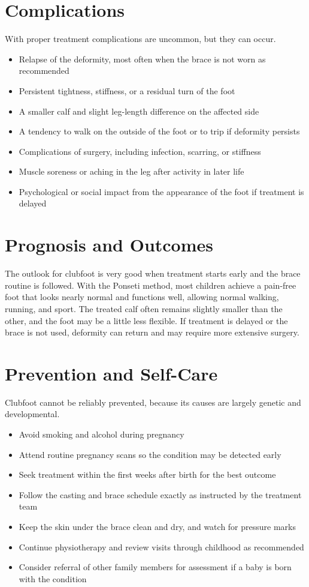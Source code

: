\section*{Complications}
With proper treatment complications are uncommon, but they can occur.
\begin{itemize}
    \item Relapse of the deformity, most often when the brace is not worn as recommended
    \item Persistent tightness, stiffness, or a residual turn of the foot
    \item A smaller calf and slight leg-length difference on the affected side
    \item A tendency to walk on the outside of the foot or to trip if deformity persists
    \item Complications of surgery, including infection, scarring, or stiffness
    \item Muscle soreness or aching in the leg after activity in later life
    \item Psychological or social impact from the appearance of the foot if treatment is delayed
\end{itemize}

\section*{Prognosis and Outcomes}
The outlook for clubfoot is very good when treatment starts early and the brace routine is followed. With the Ponseti method, most children achieve a pain-free foot that looks nearly normal and functions well, allowing normal walking, running, and sport. The treated calf often remains slightly smaller than the other, and the foot may be a little less flexible. If treatment is delayed or the brace is not used, deformity can return and may require more extensive surgery.

\section*{Prevention and Self-Care}
Clubfoot cannot be reliably prevented, because its causes are largely genetic and developmental.
\begin{itemize}
    \item Avoid smoking and alcohol during pregnancy
    \item Attend routine pregnancy scans so the condition may be detected early
    \item Seek treatment within the first weeks after birth for the best outcome
    \item Follow the casting and brace schedule exactly as instructed by the treatment team
    \item Keep the skin under the brace clean and dry, and watch for pressure marks
    \item Continue physiotherapy and review visits through childhood as recommended
    \item Consider referral of other family members for assessment if a baby is born with the condition
\end{itemize}
